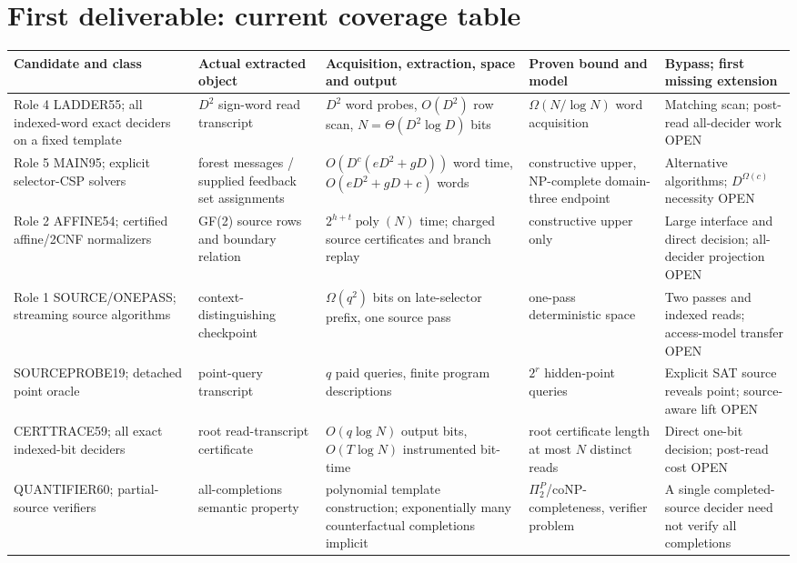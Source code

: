 \documentclass[11pt]{article}
\begin{document}
\section{First deliverable: current coverage table}
\begingroup\scriptsize\renewcommand{\arraystretch}{1.2}
\begin{tabularx}{\linewidth}{@{}p{0.83in}p{1.02in}p{1.42in}p{1.14in}X@{}}
\toprule
Candidate and class & Actual extracted object & Acquisition, extraction, space and output & Proven bound and model & Bypass; first missing extension\\
\midrule
Role 4 LADDER55; all indexed-word exact deciders on a fixed template & $D^2$ sign-word read transcript & $D^2$ word probes, $O(D^2)$ row scan, $N=\Theta(D^2\log D)$ bits & $\Omega(N/\log N)$ word acquisition & Matching scan; post-read all-decider work OPEN\\
Role 5 MAIN95; explicit selector-CSP solvers & forest messages / supplied feedback set assignments & $O(D^c(eD^2+gD))$ word time, $O(eD^2+gD+c)$ words & constructive upper, NP-complete domain-three endpoint & Alternative algorithms; $D^{\Omega(c)}$ necessity OPEN\\
Role 2 AFFINE54; certified affine/2CNF normalizers & GF(2) source rows and boundary relation & $2^{h+t}\operatorname{poly}(N)$ time; charged source certificates and branch replay & constructive upper only & Large interface and direct decision; all-decider projection OPEN\\
Role 1 SOURCE/ONEPASS; streaming source algorithms & context-distinguishing checkpoint & $\Omega(q^2)$ bits on late-selector prefix, one source pass & one-pass deterministic space & Two passes and indexed reads; access-model transfer OPEN\\
SOURCEPROBE19; detached point oracle & point-query transcript & $q$ paid queries, finite program descriptions & $2^r$ hidden-point queries & Explicit SAT source reveals point; source-aware lift OPEN\\
CERTTRACE59; all exact indexed-bit deciders & root read-transcript certificate & $O(q\log N)$ output bits, $O(T\log N)$ instrumented bit-time & root certificate length at most $N$ distinct reads & Direct one-bit decision; post-read cost OPEN\\
QUANTIFIER60; partial-source verifiers & all-completions semantic property & polynomial template construction; exponentially many counterfactual completions implicit & $\Pi_2^P$/coNP-completeness, verifier problem & A single completed-source decider need not verify all completions\\

\end{tabularx}
\end{document}
